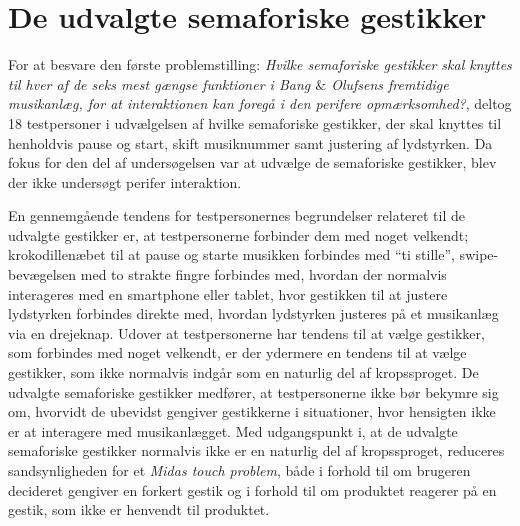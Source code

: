 \section{De udvalgte semaforiske gestikker}
\label{DiskussionUdvalgteGestikker}
%
For at besvare den første problemstilling: \textit{Hvilke semaforiske gestikker skal knyttes til hver af de seks mest gængse funktioner i Bang $\&$ Olufsens fremtidige musikanlæg, for at interaktionen kan foregå i den perifere opmærksomhed?}, deltog 18 testpersoner i udvælgelsen af hvilke semaforiske gestikker, der skal knyttes til henholdvis pause og start, skift musiknummer samt justering af lydstyrken. Da fokus for den del af undersøgelsen var at udvælge de semaforiske gestikker, blev der ikke undersøgt perifer interaktion. 

En gennemgående tendens for testpersonernes begrundelser relateret til de udvalgte gestikker er, at testpersonerne forbinder dem med noget velkendt; krokodillenæbet til at pause og starte musikken forbindes med \enquote{ti stille}, swipe-bevægelsen med to strakte fingre forbindes med, hvordan der normalvis interageres med en smartphone eller tablet, hvor gestikken til at justere lydstyrken forbindes direkte med, hvordan lydstyrken justeres på et musikanlæg via en drejeknap. Udover at testpersonerne har tendens til at vælge gestikker, som forbindes med noget velkendt, er der ydermere en tendens til at vælge gestikker, som ikke normalvis indgår som en naturlig del af kropssproget. De udvalgte semaforiske gestikker medfører, at testpersonerne ikke bør bekymre sig om, hvorvidt de ubevidst gengiver gestikkerne i situationer, hvor hensigten ikke er at interagere med musikanlægget. Med udgangspunkt i, at de udvalgte semaforiske gestikker normalvis ikke er en naturlig del af kropssproget, reduceres sandsynligheden for et \textit{Midas touch problem}, både i forhold til om brugeren decideret gengiver en forkert gestik og i forhold til om produktet reagerer på en gestik, som ikke er henvendt til produktet. 

